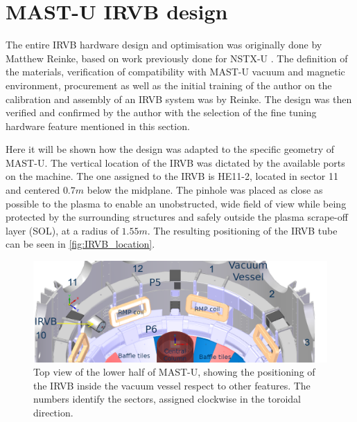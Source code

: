 \section{MAST-U IRVB design}\label{MAST-U IRVB design}
The entire IRVB hardware design and optimisation was originally done by Matthew Reinke, based on work previously done for NSTX-U \cite{VanEden2016}. The definition of the materials, verification of compatibility with MAST-U vacuum and magnetic environment, procurement as well as the initial training of the author on the calibration and assembly of an IRVB system was by Reinke. The design was then verified and confirmed by the author with the selection of the fine tuning hardware feature mentioned in this section.

Here it will be shown how the design was adapted to the specific geometry of MAST-U.
The vertical location of the IRVB was dictated by the available ports on the machine. The one assigned to the IRVB is HE11-2, located in sector 11 and centered $0.7m$ below the midplane. The pinhole was placed as close as possible to the plasma to enable an unobstructed, wide field of view while being protected by the surrounding structures and safely outside the plasma scrape-off layer (SOL), at a radius of $1.55m$. The resulting positioning of the IRVB tube can be seen in \autoref{fig:IRVB_location}. 

\begin{figure}[!ht]
	\centering
	\includegraphics[trim={7 0 60 0},clip,width=0.8\linewidth]{Chapters/chapter2/figs/where_irvb2.png}
	\caption{Top view of the lower half of MAST-U, showing the positioning of the IRVB inside the vacuum vessel respect to other features. The numbers identify the sectors, assigned clockwise in the toroidal direction.}
	\label{fig:IRVB_location}
\end{figure}

